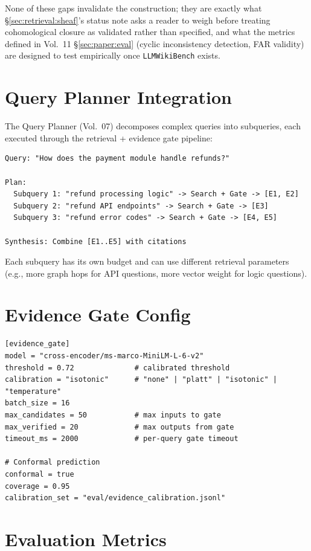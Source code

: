 None of these gaps invalidate the construction; they are exactly what \S\ref{sec:retrieval:sheaf}'s status note asks a reader to weigh before treating cohomological closure as validated rather than specified, and what the metrics defined in Vol.~11 \S\ref{sec:paper:eval} (cyclic inconsistency detection, FAR validity) are designed to test empirically once \texttt{LLMWikiBench} exists.

\section{Query Planner Integration}
\label{sec:retrieval:planner-integration}

The Query Planner (Vol.~07) decomposes complex queries into subqueries, each executed through the retrieval + evidence gate pipeline:

\begin{verbatim}
Query: "How does the payment module handle refunds?"

Plan:
  Subquery 1: "refund processing logic" -> Search + Gate -> [E1, E2]
  Subquery 2: "refund API endpoints" -> Search + Gate -> [E3]
  Subquery 3: "refund error codes" -> Search + Gate -> [E4, E5]

Synthesis: Combine [E1..E5] with citations
\end{verbatim}

Each subquery has its own budget and can use different retrieval parameters (e.g., more graph hops for API questions, more vector weight for logic questions).

\section{Evidence Gate Config}
\label{sec:retrieval:evidence-config}

\begin{verbatim}
[evidence_gate]
model = "cross-encoder/ms-marco-MiniLM-L-6-v2"
threshold = 0.72              # calibrated threshold
calibration = "isotonic"      # "none" | "platt" | "isotonic" | "temperature"
batch_size = 16
max_candidates = 50           # max inputs to gate
max_verified = 20             # max outputs from gate
timeout_ms = 2000             # per-query gate timeout

# Conformal prediction
conformal = true
coverage = 0.95
calibration_set = "eval/evidence_calibration.jsonl"
\end{verbatim}

\section{Evaluation Metrics}
\label{sec:retrieval:metrics}

